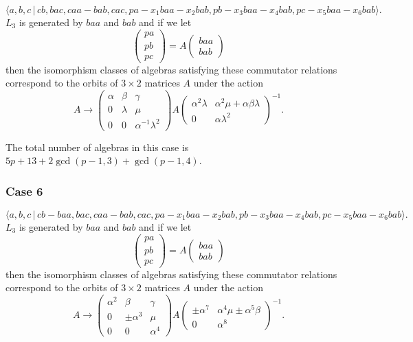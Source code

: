 \documentclass[10pt]{article}
\begin{document}
\begin{equation}
\langle
a,b,c\,|%
\,cb,bac,caa-bab,cac,pa-x_{1}baa-x_{2}bab,pb-x_{3}baa-x_{4}bab,pc-x_{5}baa-x_{6}bab\rangle .
\tag{7.761}
\end{equation}%
$L_{3}$ is generated by $baa$ and $bab$ and if we let 
\[
\left( 
\begin{array}{l}
pa \\ 
pb \\ 
pc%
\end{array}%
\right) =A\left( 
\begin{array}{l}
baa \\ 
bab%
\end{array}%
\right) 
\]%
then the isomorphism classes of algebras satisfying these commutator
relations correspond to the orbits of $3\times 2$ matrices $A$ under the
action 
\[
A\rightarrow \left( 
\begin{array}{lll}
\alpha & \beta & \gamma \\ 
0 & \lambda & \mu \\ 
0 & 0 & \alpha ^{-1}\lambda ^{2}%
\end{array}%
\right) A\left( 
\begin{array}{ll}
\alpha ^{2}\lambda & \alpha ^{2}\mu +\alpha \beta \lambda \\ 
0 & \alpha \lambda ^{2}%
\end{array}%
\right) ^{-1}. 
\]%
$\allowbreak \allowbreak $

The total number of algebras in this case is $5p+13+2\gcd (p-1,3)+\gcd
(p-1,4)$.

\subsubsection{Case 6}

\begin{equation}
\langle
a,b,c\,|%
\,cb-baa,bac,caa-bab,cac,pa-x_{1}baa-x_{2}bab,pb-x_{3}baa-x_{4}bab,pc-x_{5}baa-x_{6}bab\rangle .
\tag{7.762}
\end{equation}%
$L_{3}$ is generated by $baa$ and $bab$ and if we let 
\[
\left( 
\begin{array}{l}
pa \\ 
pb \\ 
pc%
\end{array}%
\right) =A\left( 
\begin{array}{l}
baa \\ 
bab%
\end{array}%
\right) 
\]%
then the isomorphism classes of algebras satisfying these commutator
relations correspond to the orbits of $3\times 2$ matrices $A$ under the
action 
\[
A\rightarrow \left( 
\begin{array}{lll}
\alpha ^{2} & \beta & \gamma \\ 
0 & \pm \alpha ^{3} & \mu \\ 
0 & 0 & \alpha ^{4}%
\end{array}%
\right) A\left( 
\begin{array}{ll}
\pm \alpha ^{7} & \alpha ^{4}\mu \pm \alpha ^{5}\beta \\ 
0 & \alpha ^{8}%
\end{array}%
\right) ^{-1}. 
\]%
$\allowbreak $
\end{document}
